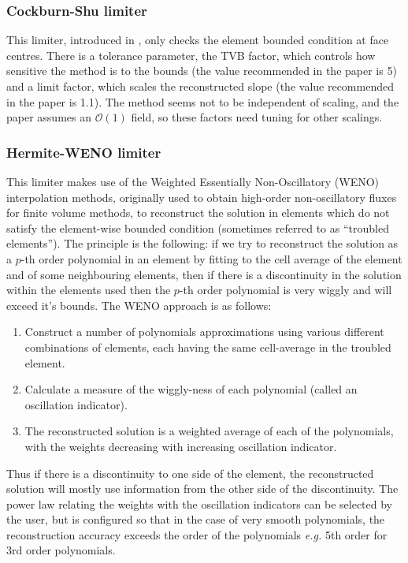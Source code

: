 \subsubsection{Cockburn-Shu limiter}
This limiter, introduced in \cite{CoSh2001}, only checks the element
bounded condition at face centres. There is a tolerance parameter, the
TVB factor, which controls how sensitive the method is to the bounds
(the value recommended in the paper is 5) and a limit factor, which
scales the reconstructed slope (the value recommended in the paper is
1.1). The method seems not to be independent of scaling, and the paper
assumes an $\mathcal{O}(1)$ field, so these factors need tuning for
other scalings.

\subsubsection{Hermite-WENO limiter}
This limiter makes use of the Weighted Essentially Non-Oscillatory
(WENO) interpolation methods, originally used to obtain high-order
non-oscillatory fluxes for finite volume methods, to reconstruct the
solution in elements which do not satisfy the element-wise bounded
condition (sometimes referred to as ``troubled elements''). The
principle is the following: if we try to reconstruct the solution as a
$p$-th order polynomial in an element by fitting to the cell average
of the element and of some neighbouring elements, then if there is a
discontinuity in the solution within the elements used then the $p$-th
order polynomial is very wiggly and will exceed it's bounds. The WENO
approach is as follows:
\begin{enumerate}
\item Construct a number of polynomials approximations using various
  different combinations of elements, each having the same cell-average
  in the troubled element.
\item Calculate a measure of the wiggly-ness of each polynomial (called 
an oscillation indicator).
\item The reconstructed solution is a weighted average of each of the
  polynomials, with the weights decreasing with increasing oscillation
  indicator.
\end{enumerate}
Thus if there is a discontinuity to one side of the element, the
reconstructed solution will mostly use information from the other side
of the discontinuity. The power law relating the weights with the
oscillation indicators can be selected by the user, but is configured
so that in the case of very smooth polynomials, the reconstruction
accuracy exceeds the order of the polynomials \emph{e.g.} 5th order for
3rd order polynomials. 

